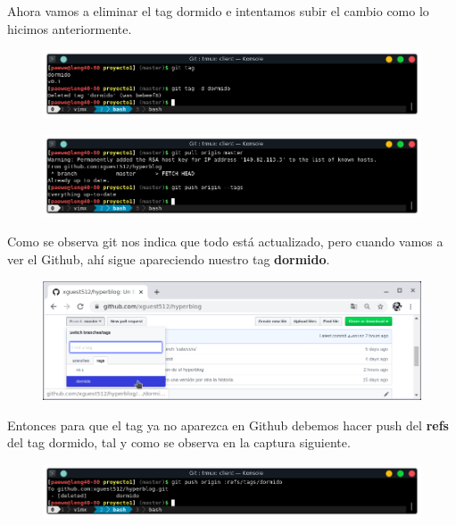 \documentclass{article}
\begin{document}
Ahora vamos a eliminar el tag dormido e intentamos subir el cambio como lo
hicimos anteriormente.

\begin{figure}[h!]
  \centering
  \includegraphics[scale=0.75]{./Pictures/242_delete_tag.png}
\end{figure}

\begin{figure}[h!]
  \centering
  \includegraphics[scale=0.75]{./Pictures/243_push_tag.png}
\end{figure}

Como se observa git nos indica que todo está actualizado, pero cuando vamos a
ver el Github, ahí sigue apareciendo nuestro tag \textbf{dormido}.

\newpage

\begin{figure}[h!]
  \centering
  \includegraphics[scale=0.75]{./Pictures/244_dormido_github.png}
\end{figure}

Entonces para que el tag ya no aparezca en Github debemos hacer push del
\textbf{refs} del tag dormido, tal y como se observa en la captura siguiente.

\begin{figure}[h!]
  \centering
  \includegraphics[scale=0.75]{./Pictures/245_push_delete_tag.png}
\end{figure}
\end{document}
